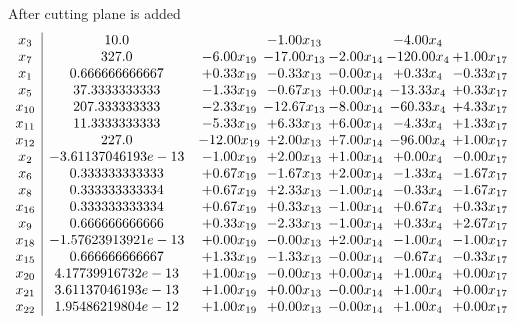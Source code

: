 \documentclass[8pt]{article}
\begin{document}
 After cutting plane is added 
\[\begin{array}{c| c c@{\hskip 2pt} c@{\hskip 2pt} c@{\hskip 2pt} c@{\hskip 2pt} c@{\hskip 2pt} }
 x_{3}   &  10.0  &   & -1.00 x_{13} &   & -4.00 x_{4} &   \\
 x_{7}   &  327.0 & -6.00 x_{19} & -17.00 x_{13} & -2.00 x_{14} & -120.00 x_{4} & +  1.00 x_{17}\\
 x_{1}   &  0.666666666667 & +  0.33 x_{19} & -0.33 x_{13} & -0.00 x_{14} & +  0.33 x_{4} & -0.33 x_{17}\\
 x_{5}   &  37.3333333333 & -1.33 x_{19} & -0.67 x_{13} & +  0.00 x_{14} & -13.33 x_{4} & +  0.33 x_{17}\\
 x_{10}   &  207.333333333 & -2.33 x_{19} & -12.67 x_{13} & -8.00 x_{14} & -60.33 x_{4} & +  4.33 x_{17}\\
 x_{11}   &  11.3333333333 & -5.33 x_{19} & +  6.33 x_{13} & +  6.00 x_{14} & -4.33 x_{4} & +  1.33 x_{17}\\
 x_{12}   &  227.0 & -12.00 x_{19} & +  2.00 x_{13} & +  7.00 x_{14} & -96.00 x_{4} & +  1.00 x_{17}\\
 x_{2}   &  -3.61137046193e-13 & -1.00 x_{19} & +  2.00 x_{13} & +  1.00 x_{14} & +  0.00 x_{4} & -0.00 x_{17}\\
 x_{6}   &  0.333333333333 & +  0.67 x_{19} & -1.67 x_{13} & +  2.00 x_{14} & -1.33 x_{4} & -1.67 x_{17}\\
 x_{8}   &  0.333333333334 & +  0.67 x_{19} & +  2.33 x_{13} & -1.00 x_{14} & -0.33 x_{4} & -1.67 x_{17}\\
 x_{16}   &  0.333333333334 & +  0.67 x_{19} & +  0.33 x_{13} & -1.00 x_{14} & +  0.67 x_{4} & +  0.33 x_{17}\\
 x_{9}   &  0.666666666666 & +  0.33 x_{19} & -2.33 x_{13} & -1.00 x_{14} & +  0.33 x_{4} & +  2.67 x_{17}\\
 x_{18}   &  -1.57623913921e-13 & +  0.00 x_{19} & -0.00 x_{13} & +  2.00 x_{14} & -1.00 x_{4} & -1.00 x_{17}\\
 x_{15}   &  0.666666666667 & +  1.33 x_{19} & -1.33 x_{13} & -0.00 x_{14} & -0.67 x_{4} & -0.33 x_{17}\\
 x_{20}   &  4.17739916732e-13 & +  1.00 x_{19} & -0.00 x_{13} & +  0.00 x_{14} & +  1.00 x_{4} & +  0.00 x_{17}\\
 x_{21}   &  3.61137046193e-13 & +  1.00 x_{19} & +  0.00 x_{13} & -0.00 x_{14} & +  1.00 x_{4} & +  0.00 x_{17}\\
 x_{22}   &  1.95486219804e-12 & +  1.00 x_{19} & +  0.00 x_{13} & -0.00 x_{14} & +  1.00 x_{4} & +  0.00 x_{17}\\

\end{array}\]
\end{document}
